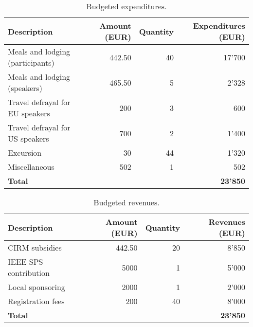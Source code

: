 \documentclass[a4paper]{scrartcl}
\begin{document}
\begin{table}[ht]
	\centering
	\begin{tabular}{|l|r|r|r|}
	\hline
	Description & Amount (EUR) & Quantity & Expenditures (EUR) \\
	\hline
	Meals and lodging (participants) &  442.50 & 40 & 17'700 \\
	Meals and lodging (speakers)     &  465.50 &  5 &  2'328 \\
	Travel defrayal for EU speakers  &  200    &  3 &    600 \\
	Travel defrayal for US speakers  &  700    &  2 &  1'400 \\
	Excursion                        &   30    & 44 &  1'320 \\
	Miscellaneous                    &  502    &  1 &    502 \\
	\hline
	\multicolumn{3}{|l|}{\textbf{Total}} & \textbf{23'850} \\
	\hline
	\end{tabular}
	\caption{Budgeted expenditures.}
	\label{tab:expenditures}
\end{table}

\begin{table}[ht]
	\centering
	\begin{tabular}{|l|r|r|r|}
	\hline
	Description & Amount (EUR) & Quantity & Revenues (EUR) \\
	\hline
	CIRM subsidies        & 442.50 & 20 & 8'850 \\
	IEEE SPS contribution & 5000   &  1 & 5'000 \\
	Local sponsoring      & 2000   &  1 & 2'000 \\
	Registration fees     &  200   & 40 & 8'000 \\
	\hline
	\multicolumn{3}{|l|}{\textbf{Total}} & \textbf{23'850} \\
	\hline
	\end{tabular}
	\caption{Budgeted revenues.}
	\label{tab:revenues}
\end{table}

\printbibliography
\end{document}
